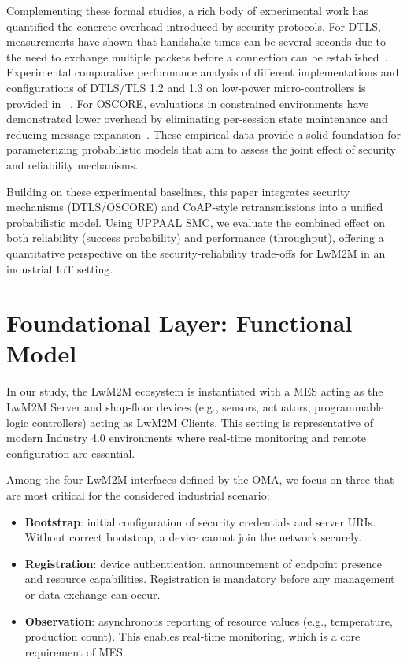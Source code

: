 \documentclass[a4paper,fleqn]{cas-sc}
\begin{document}
Complementing these formal studies, a rich body of experimental work has quantified the concrete overhead introduced by security protocols. For DTLS, measurements have shown that handshake times can be several seconds due to the need to exchange multiple packets before a connection can be established~\cite{hummen2015dtls}. Experimental comparative performance analysis of different implementations and configurations of DTLS/TLS 1.2 and 1.3 on low‑power micro-controllers is provided in ~\cite{restuccia2020low}. For OSCORE, evaluations in constrained environments have demonstrated lower overhead by eliminating per‑session state maintenance and reducing message expansion~\cite{gundougan2020iot,gunnarsson2021evaluating}. These empirical data provide a solid foundation for parameterizing probabilistic models that aim to assess the joint effect of security and reliability mechanisms.

Building on these experimental baselines, this paper integrates security mechanisms (DTLS/OSCORE) and CoAP‑style retransmissions into a unified probabilistic model. Using UPPAAL SMC, we evaluate the combined effect on both reliability (success probability) and performance (throughput), offering a quantitative perspective on the security‑reliability trade‑offs for LwM2M in an industrial IoT setting.

\section{Foundational Layer: Functional Model}
In our study, the LwM2M ecosystem is instantiated with a MES acting as the LwM2M Server and shop‑floor devices (e.g., sensors, actuators, programmable logic controllers) acting as LwM2M Clients. This setting is representative of modern Industry 4.0 environments where real‑time monitoring and remote configuration are essential.

Among the four LwM2M interfaces defined by the OMA, we focus on three that are most critical for the considered industrial scenario:

\begin{itemize}
    \item \textbf{Bootstrap}: initial configuration of security credentials and server URIs. Without correct bootstrap, a device cannot join the network securely.
    \item \textbf{Registration}: device authentication, announcement of endpoint presence and resource capabilities. Registration is mandatory before any management or data exchange can occur.
    \item \textbf{Observation}: asynchronous reporting of resource values (e.g., temperature, production count). This enables real‑time monitoring, which is a core requirement of MES.
\end{itemize}
\end{document}
